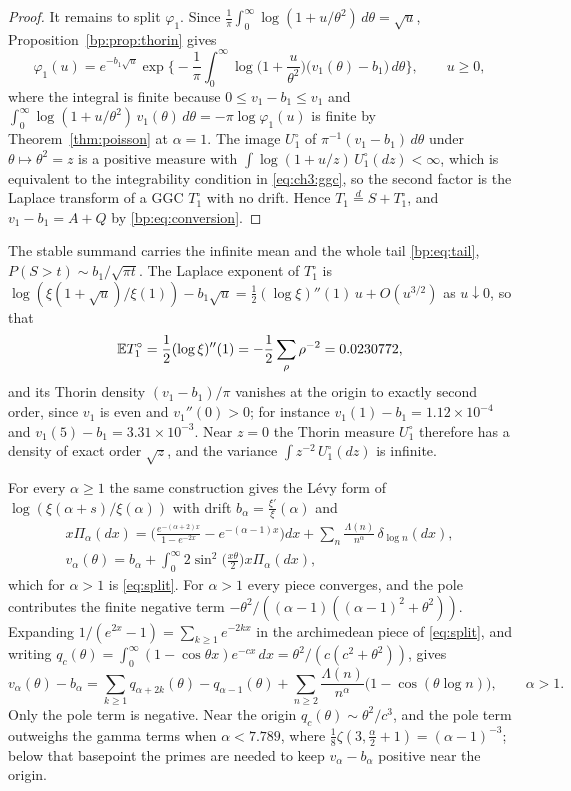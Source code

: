\begin{proof}
It remains to split $\varphi_1$. Since $\frac1\pi\int_0^\infty\log(1+u/\theta^2)\,d\theta=\sqrt u$, Proposition~\ref{bp:prop:thorin} gives
\[
\varphi_1(u)=e^{-b_1\sqrt u}\exp\Big\{-\frac1\pi\int_0^\infty\log\Big(1+\frac u{\theta^2}\Big)\big(v_1(\theta)-b_1\big)\,d\theta\Big\},\qquad u\ge0,
\]
where the integral is finite because $0\le v_1-b_1\le v_1$ and $\int_0^\infty\log(1+u/\theta^2)\,v_1(\theta)\,d\theta=-\pi\log\varphi_1(u)$ is finite by Theorem~\ref{thm:poisson} at $\alpha=1$. The image $U_1^\circ$ of $\pi^{-1}(v_1-b_1)\,d\theta$ under $\theta\mapsto\theta^2=z$ is a positive measure with $\int\log(1+u/z)\,U_1^\circ(dz)<\infty$, which is equivalent to the integrability condition in \eqref{eq:ch3:ggc}, so the second factor is the Laplace transform of a GGC $T_1^\circ$ with no drift. Hence $T_1\stackrel d=S+T_1^\circ$, and $v_1-b_1=A+Q$ by \eqref{bp:eq:conversion}.
\end{proof}

The stable summand carries the infinite mean and the whole tail \eqref{bp:eq:tail}, $P(S>t)\sim b_1/\sqrt{\pi t}$. The Laplace exponent of $T_1^\circ$ is $\log(\xi(1+\sqrt u)/\xi(1))-b_1\sqrt u=\frac12(\log\xi)''(1)\,u+O(u^{3/2})$ as $u\downarrow0$, so that
\[
\mathbb{E} T_1^\circ=\frac12(\log\xi)''(1)=-\frac12\sum_\rho\rho^{-2}=0.0230772,
\]
and its Thorin density $(v_1-b_1)/\pi$ vanishes at the origin to exactly second order, since $v_1$ is even and $v_1''(0)>0$; for instance $v_1(1)-b_1=1.12\times10^{-4}$ and $v_1(5)-b_1=3.31\times10^{-3}$. Near $z=0$ the Thorin measure $U_1^\circ$ therefore has a density of exact order $\sqrt z$, and the variance $\int z^{-2}\,U_1^\circ(dz)$ is infinite.

For every $\alpha\ge1$ the same construction gives the L\'evy form of $\log(\xi(\alpha+s)/\xi(\alpha))$ with drift $b_\alpha=\frac{\xi'}\xi(\alpha)$ and
\begin{gather*}
x\Pi_\alpha(dx)=\Big(\frac{e^{-(\alpha+2)x}}{1-e^{-2x}}-e^{-(\alpha-1)x}\Big)dx+\sum_n\frac{\Lambda(n)}{n^\alpha}\,\delta_{\log n}(dx),\\
v_\alpha(\theta)=b_\alpha+\int_0^\infty2\sin^2\Big(\frac{x\theta}2\Big)x\Pi_\alpha(dx),
\end{gather*}
which for $\alpha>1$ is \eqref{eq:split}. For $\alpha>1$ every piece converges, and the pole contributes the finite negative term $-\theta^2/((\alpha-1)((\alpha-1)^2+\theta^2))$. Expanding $1/(e^{2x}-1)=\sum_{k\ge1}e^{-2kx}$ in the archimedean piece of \eqref{eq:split}, and writing $q_c(\theta)=\int_0^\infty(1-\cos\theta x)e^{-cx}\,dx=\theta^2/(c(c^2+\theta^2))$, gives
\begin{equation}\label{bp:eq:excess}
v_\alpha(\theta)-b_\alpha=\sum_{k\ge1}q_{\alpha+2k}(\theta)-q_{\alpha-1}(\theta)+\sum_{n\ge2}\frac{\Lambda(n)}{n^\alpha}\big(1-\cos(\theta\log n)\big),\qquad\alpha>1 .
\end{equation}
Only the pole term is negative. Near the origin $q_c(\theta)\sim\theta^2/c^3$, and the pole term outweighs the gamma terms when $\alpha<7.789$, where $\frac18\zeta(3,\frac\alpha2+1)=(\alpha-1)^{-3}$; below that basepoint the primes are needed to keep $v_\alpha-b_\alpha$ positive near the origin.

